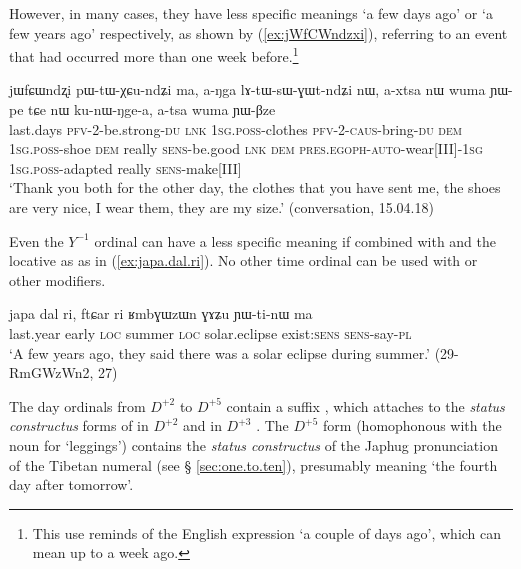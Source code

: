 However, in many cases, they have less specific meanings `a few days ago' or `a few years ago' respectively,  as shown by (\ref{ex:jWfCWndzxi}), referring to an event that had occurred more than one week before.\footnote{This use reminds of the English expression `a couple of days ago', which can mean up to a week ago. }

\begin{exe}
\ex \label{ex:jWfCWndzxi}
\gll jɯfɕɯndʐi pɯ-tɯ-χɕu-ndʑi ma, a-ŋga lɤ-tɯ-sɯ-ɣɯt-ndʑi nɯ, a-xtsa nɯ wuma ɲɯ-pe tɕe nɯ ku-nɯ-ŋge-a,  a-tsa wuma ɲɯ-βze \\ 
last.days \textsc{pfv}-2-be.strong-\textsc{du} \textsc{lnk} \textsc{1sg}.\textsc{poss}-clothes \textsc{pfv}-2-\textsc{caus}-bring-\textsc{du} \textsc{dem} \textsc{1sg}.\textsc{poss}-shoe \textsc{dem} really \textsc{sens}-be.good \textsc{lnk} \textsc{dem} \textsc{pres}.\textsc{egoph}-\textsc{auto}-wear[III]-\textsc{1sg}  \textsc{1sg}.\textsc{poss}-adapted really \textsc{sens}-make[III] \\
\glt `Thank you both for the other day, the clothes that you have sent me, the shoes are very nice, I wear them, they are my size.' (conversation, 15.04.18)
\end{exe}

Even the $Y^{-1}$ ordinal  can have a less specific meaning if combined with  and the locative  as  as in (\ref{ex:japa.dal.ri}). No other time ordinal can be used with  or other modifiers.

\begin{exe}
\ex \label{ex:japa.dal.ri}
\gll japa dal ri, ftɕar ri  ʁmbɣɯzɯn ɣɤʑu ɲɯ-ti-nɯ ma \\
 last.year early \textsc{loc} summer \textsc{loc} solar.eclipse exist:\textsc{sens} \textsc{sens}-say-\textsc{pl} \\
\glt `A few years ago, they said there was a solar eclipse during summer.' (29-RmGWzWn2, 27)
\end{exe}

The day ordinals from $D^{+2}$ to $D^{+5}$ contain a suffix , which attaches to the \textit{status constructus} forms of  in $D^{+2}$  and  in $D^{+3}$ . The $D^{+5}$ form  (homophonous with the noun for `leggings') contains the \textit{status constructus}  of the Japhug pronunciation  of the Tibetan numeral   (see § \ref{sec:one.to.ten}), presumably meaning `the fourth day after tomorrow'.

